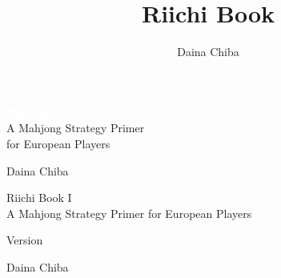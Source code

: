 \documentclass{book}
\title{Riichi Book}
\author{Daina Chiba}
\newcommand{\theversion}{7.0}
\begin{document}
\frontmatter
{}

\thispagestyle{empty}


\begin{flushleft}

\vspace*{.24\paperheight}

\begin{spacing}{2.5}
\textcolor{White}{\fontsize{2.0cm}{3.6em}\scshape Riichi Book I}\\
{\LARGE A Mahjong Strategy Primer\\for European Players}
\end{spacing}

\vspace*{.08\paperheight}
\hfill {\LARGE Daina Chiba}

\end{flushleft}

\restoregeometry


\thispagestyle{empty}
\mbox{}\newpage

\thispagestyle{empty}
\setcounter{page}{1}
\pagebreak
\onehalfspacing

\begin{flushright}

\vspace*{.18\paperheight}

\begin{spacing}{3}
{\Huge Riichi Book I}\\
{\Large A Mahjong Strategy Primer for European Players}
\end{spacing}

\vspace*{.11\textheight}

{\Large Version }\\

\vspace*{.07\textheight}

{\Large
Daina Chiba\\
}

\vfill

\end{flushright}
\end{document}
